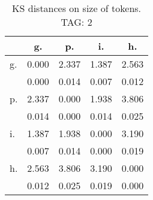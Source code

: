 \begin{table}[h!]
\begin{center}
\begin{tabular}{| l | c | c | c | c |}\hline
 & g. & p. & i. & h. \\\hline
g. & 0.000  & 2.337  & 1.387  & 2.563 \\\hline
 & 0.000  & 0.014  & 0.007  & 0.012 \\\hline
p. & 2.337  & 0.000  & 1.938  & 3.806 \\\hline
 & 0.014  & 0.000  & 0.014  & 0.025 \\\hline
i. & 1.387  & 1.938  & 0.000  & 3.190 \\\hline
 & 0.007  & 0.014  & 0.000  & 0.019 \\\hline
h. & 2.563  & 3.806  & 3.190  & 0.000 \\\hline
 & 0.012  & 0.025  & 0.019  & 0.000 \\\hline
\end{tabular}
\caption{KS distances on size of tokens. TAG: 2}
\end{center}
\end{table}